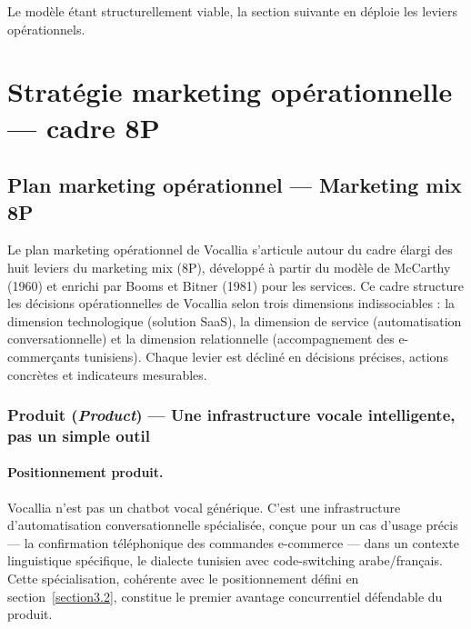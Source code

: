 Le modèle étant structurellement viable, la section suivante en déploie les leviers opérationnels.

\section{Stratégie marketing opérationnelle --- cadre 8P}
\label{section3.6}

\subsection{Plan marketing opérationnel --- Marketing mix 8P}

Le plan marketing opérationnel de Vocallia s'articule autour du cadre élargi des
huit leviers du marketing mix (8P), développé à partir du modèle de
McCarthy (1960) et enrichi par Booms et Bitner (1981) pour les services.
Ce cadre structure les décisions opérationnelles de Vocallia selon trois
dimensions indissociables : la dimension technologique (solution SaaS), la
dimension de service (automatisation conversationnelle) et la dimension
relationnelle (accompagnement des e-commerçants tunisiens). Chaque levier
est décliné en décisions précises, actions concrètes et indicateurs mesurables.

\subsubsection{Produit (\textit{Product}) --- Une infrastructure vocale intelligente,
pas un simple outil}

\paragraph{Positionnement produit.}
Vocallia n'est pas un chatbot vocal générique. C'est une infrastructure
d'automatisation conversationnelle spécialisée, conçue pour un cas d'usage
précis --- la confirmation téléphonique des commandes e-commerce --- dans un
contexte linguistique spécifique, le dialecte tunisien avec code-switching
arabe/français. Cette spécialisation, cohérente avec le positionnement défini en
section~\ref{section3.2}, constitue le premier avantage concurrentiel défendable
du produit.

